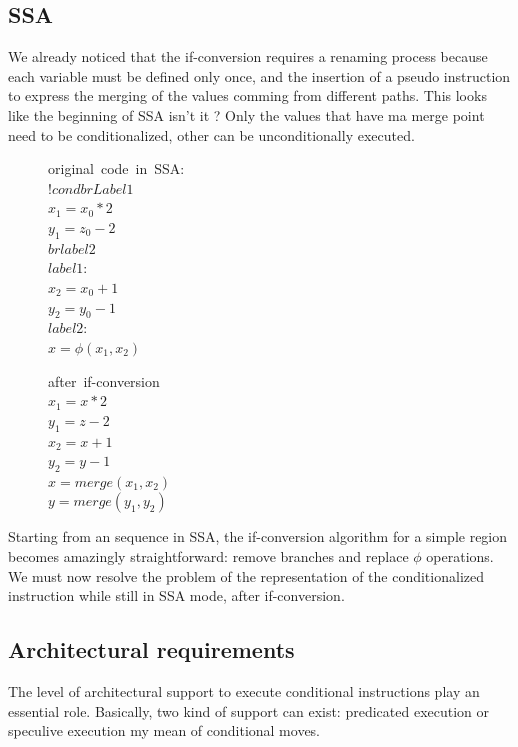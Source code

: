 \subsection{SSA}

We already noticed that the if-conversion requires a renaming process because each variable must be defined only once, and the insertion of a pseudo instruction to express the merging of the values comming from different paths. This looks like the beginning of SSA isn't it ?
Only the values that have ma merge point need to be conditionalized, other can be unconditionally executed.

\begin{figure}
\begin{minipage}[t]{4cm}
\mbox{original code in SSA:} \\
$ !cond br Label1 $ \\
$ x_1 = x_0 * 2 $ \\
$ y_1 = z_0 - 2 $ \\
$ br label2 $ \\
$ label1: $ \\
$ x_2 = x_0 + 1 $ \\
$ y_2 = y_0 - 1 $ \\
$ label2: $ \\
$ x = \phi (x_1,x_2) $ \\
\end{minipage} 
\begin{minipage}[t]{4cm} 
\mbox{after if-conversion} \\
$ x_1 = x * 2 $ \\
$ y_1 = z - 2 $ \\
$ x_2 = x + 1 $ \\
$ y_2 = y - 1 $ \\
$ x = \textit{merge}(x_1,x_2) $ \\
$ y = \textit{merge}(y_1,y_2) $ \\
\end{minipage}
\end{figure}

Starting from an sequence in SSA, the if-conversion algorithm for a simple region becomes amazingly straightforward: remove branches and replace $\phi$ operations. We must now resolve the problem of the representation of the conditionalized instruction while still in SSA mode, after if-conversion. 

\subsection{Architectural requirements}
The level of architectural support to execute conditional instructions play an essential role. Basically, two kind of support can exist: predicated execution or  speculive execution my mean of conditional moves.


